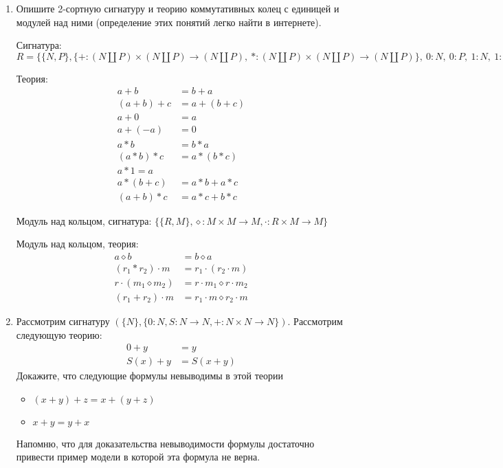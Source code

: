 \begin{enumerate}

\item Опишите 2-сортную сигнатуру и теорию коммутативных колец с единицей и модулей над ними (определение этих 
понятий легко найти в интернете).

Сигнатура: $R=\{ \{N, P\}, \{
+:(N \amalg P) \times (N \amalg P) \rightarrow (N \amalg P), \
*:(N \amalg P) \times (N \amalg P) \rightarrow (N \amalg P) \}, \ 
0:N, \ 
0:P, \ 
1:N, \ 
1:P
\}$
						   
Теория:
\begin{align*}
	a + b &= b + a \\
	(a + b) + c &= a + (b + c) \\
	a + 0 &= a \\
	a + (-a) &= 0 \\
	a * b &= b * a \\
	(a * b) * c &= a * (b * c) \\
	a * 1 = a \\
	a * (b + c) &= a * b + a * c \\
	(a + b) * c &= a * c + b * c
\end{align*}

Модуль над кольцом, сигнатура: $\{ \{R, M\}, \diamond : M\times M \rightarrow M, \cdot:R\times M \rightarrow M \}$

Модуль над кольцом, теория:
\begin{align*}
a \diamond b &= b \diamond a \\
(r_1 * r_2) \cdot m &= r_1 \cdot (r_2 \cdot m) \\
r\cdot (m_1 \diamond m_2) &= r\cdot m_1 \diamond r \cdot m_2 \\
(r_1 + r_2) \cdot m &= r_1 \cdot m \diamond r_2 \cdot m
\end{align*}


\item Рассмотрим сигнатуру $(\{N\}, \{ 0 : N, S : N \to N, + : N \times N \to N \})$.
    Рассмотрим следующую теорию:
\begin{align*}
0 + y & = y \\
S(x) + y & = S(x + y)
\end{align*}
Докажите, что следующие формулы невыводимы в этой теории
\begin{itemize}
\item $(x + y) + z = x + (y + z)$
\item $x + y = y + x$
\end{itemize}
Напомню, что для доказательства невыводимости формулы достаточно привести пример модели в которой эта формула не 
верна.


\end{enumerate}
